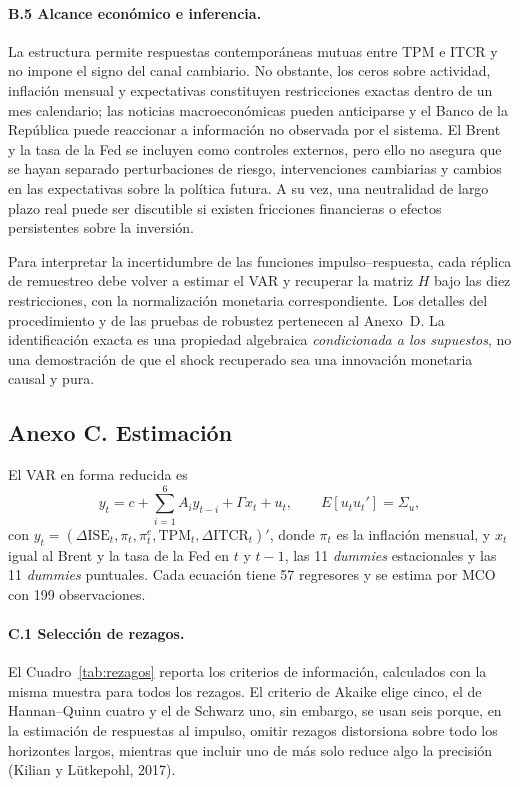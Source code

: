 \documentclass[12pt,letterpaper]{article}
\begin{document}
\paragraph{B.5 Alcance económico e inferencia.}
La estructura permite respuestas contemporáneas mutuas entre TPM e ITCR y no impone el signo del canal cambiario. No obstante, los ceros sobre actividad, inflación mensual y expectativas constituyen restricciones exactas dentro de un mes calendario; las noticias macroeconómicas pueden anticiparse y el Banco de la República puede reaccionar a información no observada por el sistema. El Brent y la tasa de la Fed se incluyen como controles externos, pero ello no asegura que se hayan separado perturbaciones de riesgo, intervenciones cambiarias y cambios en las expectativas sobre la política futura. A su vez, una neutralidad de largo plazo real puede ser discutible si existen fricciones financieras o efectos persistentes sobre la inversión.

Para interpretar la incertidumbre de las funciones impulso--respuesta, cada réplica de remuestreo debe volver a estimar el VAR y recuperar la matriz $H$ bajo las diez restricciones, con la normalización monetaria correspondiente. Los detalles del procedimiento y de las pruebas de robustez pertenecen al Anexo~D. La identificación exacta es una propiedad algebraica \emph{condicionada a los supuestos}, no una demostración de que el shock recuperado sea una innovación monetaria causal y pura.

\subsection*{Anexo C. Estimación}

El VAR en forma reducida es
\begin{equation}
y_t = c + \sum_{i=1}^{6} A_i y_{t-i} + \Gamma x_t + u_t, \qquad E[u_t u_t'] = \Sigma_u,
\end{equation}
con $y_t = (\Delta\text{ISE}_t, \pi_t, \pi^e_t, \text{TPM}_t, \Delta\text{ITCR}_t)'$, donde $\pi_t$ es la inflación mensual, y $x_t$ igual al Brent y la tasa de la Fed en $t$ y $t-1$, las 11 \textit{dummies} estacionales y las 11 \textit{dummies} puntuales. Cada ecuación tiene 57 regresores y se estima por MCO con 199 observaciones.

\paragraph{C.1 Selección de rezagos.} El Cuadro~\ref{tab:rezagos} reporta los criterios de información, calculados con la misma muestra para todos los rezagos. El criterio de Akaike elige cinco, el de Hannan--Quinn cuatro y el de Schwarz uno, sin embargo, se usan seis porque, en la estimación de respuestas al impulso, omitir rezagos distorsiona sobre todo los horizontes largos, mientras que incluir uno de más solo reduce algo la precisión (Kilian y Lütkepohl, 2017).
\end{document}

